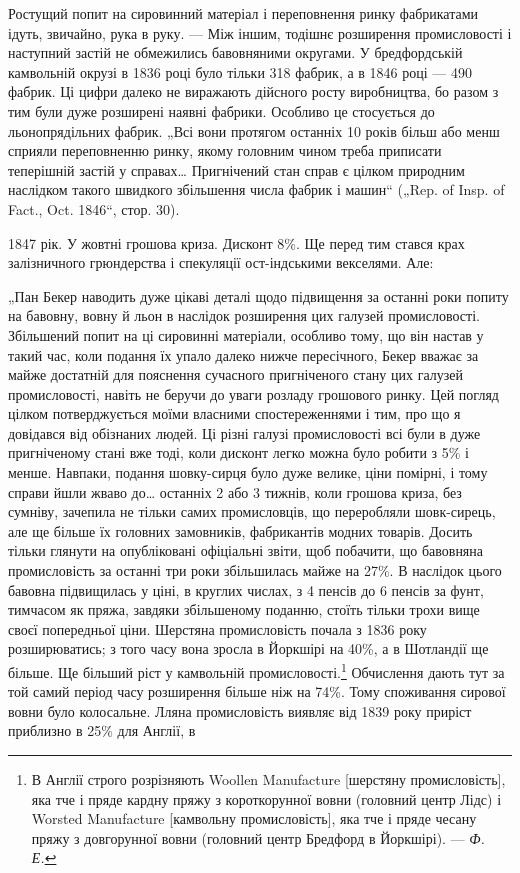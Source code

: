 
Ростущий попит на сировинний матеріал і переповнення
ринку фабрикатами ідуть, звичайно, рука в руку. — Між іншим,
тодішнє розширення промисловості і наступний застій не обмежились
бавовняними округами. У бредфордській камвольній
окрузі в 1836 році було тільки 318 фабрик, а в 1846 році —
490 фабрик. Ці цифри далеко не виражають дійсного росту
виробництва, бо разом з тим були дуже розширені наявні фабрики.
Особливо це стосується до льонопрядільних фабрик. „Всі
вони протягом останніх 10 років більш або менш сприяли переповненню
ринку, якому головним чином треба приписати теперішній
застій у справах\dots{} Пригнічений стан справ є цілком природним
наслідком такого швидкого збільшення числа фабрик
і машин“ („Rep. of Insp. of Fact., Oct. 1846“, стор. 30).

1847 рік. У жовтні грошова криза. Дисконт 8\%. Ще перед
тим стався крах залізничного грюндерства і спекуляції ост-індськими
векселями. Але:

„Пан Бекер наводить дуже цікаві деталі щодо підвищення
за останні роки попиту на бавовну, вовну й льон в наслідок
розширення цих галузей промисловості. Збільшений попит на ці
сировинні матеріали, особливо тому, що він настав у такий час,
коли подання їх упало далеко нижче пересічного, Бекер вважає
за майже достатній для пояснення сучасного пригніченого стану
цих галузей промисловості, навіть не беручи до уваги розладу
грошового ринку. Цей погляд цілком потверджується моїми
власними спостереженнями і тим, про що я довідався від обізнаних
людей. Ці різні галузі промисловості всі були в дуже
пригніченому стані вже тоді, коли дисконт легко можна було
робити з 5\% і менше. Навпаки, подання шовку-сирця було дуже
велике, ціни помірні, і тому справи йшли жваво до\dots{} останніх
2 або 3 тижнів, коли грошова криза, без сумніву, зачепила не
тільки самих промисловців, що переробляли шовк-сирець, але
ще більше їх головних замовників, фабрикантів модних товарів.
Досить тільки глянути на опубліковані офіціальні звіти, щоб побачити,
що бавовняна промисловість за останні три роки збільшилась
майже на 27\%. В наслідок цього бавовна підвищилась
у ціні, в круглих числах, з 4 пенсів до 6 пенсів за фунт, тимчасом
як пряжа, завдяки збільшеному поданню, стоїть тільки
трохи вище своєї попередньої ціни. Шерстяна промисловість почала
з 1836 року розширюватись; з того часу вона зросла в
Йоркшірі на 40\%, а в Шотландії ще більше. Ще більший ріст
у камвольній промисловості.\footnote{
В Англії строго розрізняють Woollen Manufacture [шерстяну промисловість],
яка тче і пряде кардну пряжу з короткорунної вовни (головний центр Лідс)
і Worsted Manufacture [камвольну промисловість], яка тче і пряде чесану пряжу
з довгорунної вовни (головний центр Бредфорд в Йоркшірі). — \emph{Ф. Е.}
} Обчислення дають тут за той
самий період часу розширення більше ніж на 74\%. Тому споживання
сирової вовни було колосальне. Лляна промисловість виявляє
від 1839 року приріст приблизно в 25\% для Англії, в
\parbreak{}  %
